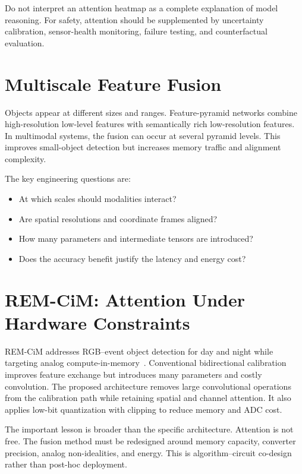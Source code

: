 \begin{engineeringcheck}
Do not interpret an attention heatmap as a complete explanation of model reasoning. For safety, attention should be supplemented by uncertainty calibration, sensor-health monitoring, failure testing, and counterfactual evaluation.
\end{engineeringcheck}

\section{Multiscale Feature Fusion}

Objects appear at different sizes and ranges. Feature-pyramid networks combine high-resolution low-level features with semantically rich low-resolution features. In multimodal systems, the fusion can occur at several pyramid levels. This improves small-object detection but increases memory traffic and alignment complexity.

The key engineering questions are:

\begin{itemize}
    \item At which scales should modalities interact?
    \item Are spatial resolutions and coordinate frames aligned?
    \item How many parameters and intermediate tensors are introduced?
    \item Does the accuracy benefit justify the latency and energy cost?
\end{itemize}

\section{REM-CiM: Attention Under Hardware Constraints}

REM-CiM addresses RGB--event object detection for day and night while targeting analog compute-in-memory~\cite{ichikawa2024remcim}. Conventional bidirectional calibration improves feature exchange but introduces many parameters and costly convolution. The proposed architecture removes large convolutional operations from the calibration path while retaining spatial and channel attention. It also applies low-bit quantization with clipping to reduce memory and ADC cost.

The important lesson is broader than the specific architecture. Attention is not free. The fusion method must be redesigned around memory capacity, converter precision, analog non-idealities, and energy. This is algorithm--circuit co-design rather than post-hoc deployment.

